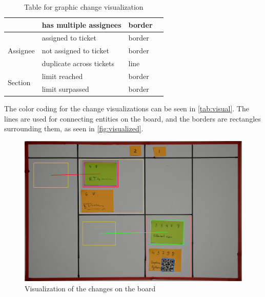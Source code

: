 \documentclass[12pt]{report}
\theoremstyle{definition}
\theoremstyle{remark}
\begin{document}
\begin{table}[h]
\begin{tabular}{|l|l|l|l|}
                              & has multiple assignees                                                                           & border                 & {\cellcolor[rgb]{0.882,0.627,0}}      \\ 
    \hline
    \multirow{3}{*}{Assignee} & assigned to ticket                                                                               & border                 & {\cellcolor[rgb]{0.039,0.353,0.902}}  \\ 
    \hhline{|~|-|-|-|}
                              & not assigned to ticket                                                                           & border                 & {\cellcolor{red}}                     \\ 
    \hhline{|~|-|-|-|}
                              & duplicate across tickets                                                                         & line                   & {\cellcolor[rgb]{0.882,0.627,0}}      \\ 
    \hline
    \multirow{2}{*}{Section}  & limit reached                                                                                    & border                 & {\cellcolor[rgb]{1,0.765,0.176}}      \\ 
    \hhline{|~|-|-|-|}
                              & limit surpassed                                                                                  & border                 & {\cellcolor[rgb]{1,0.392,0.392}}      \\
    \hline
    \end{tabular}
    \caption{Table for graphic change visualization}
    \label{tab:visual}
    \end{table}

The color coding for the change visualizations can be seen in \autoref{tab:visual}. The lines are used for connecting entities on the board, and the borders are rectangles surrounding them, as seen in \autoref{fig:visualized}.

\begin{figure}[h]
    \centering
    \includegraphics[width=\textwidth]{pipeline/board_extracted.jpg}
    \caption{Visualization of the changes on the board}
    \label{fig:visualized}
\end{figure}
\end{document}
